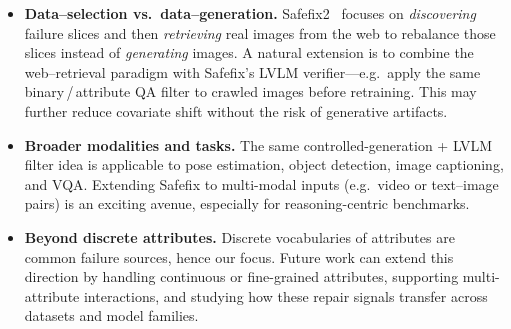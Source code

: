 \documentclass[10pt]{article} %
\newcommand{\model}{Safefix\xspace}
\begin{document}
\begin{itemize}
  \item \textbf{Data–selection vs.\ data–generation.}  
        Safefix2~\citep{chen2025hibug2} focuses on \emph{discovering} failure slices and then
        \emph{retrieving} real images from the web to
        rebalance those slices instead of \emph{generating} images.  A natural extension is to combine the
        web–retrieval paradigm with Safefix’s LVLM verifier—e.g.\ apply the
        same binary\,/\,attribute QA filter to crawled images before
        retraining. This may further reduce covariate shift without the
        risk of generative artifacts.




  \item \textbf{Broader modalities and tasks.}  
        The same controlled-generation + LVLM filter idea is applicable to
        pose estimation, object detection, image captioning, and VQA.
        Extending \model{} to multi-modal inputs (e.g.\ video or text–image
        pairs) is an exciting avenue, especially for reasoning-centric
        benchmarks.
        
    \item \textbf{Beyond discrete attributes.} Discrete vocabularies of attributes are common failure sources, hence our focus. Future work can extend this direction by handling continuous or fine-grained attributes, supporting multi-attribute interactions, and studying how these repair signals transfer across datasets and model families.
\end{itemize}
\end{document}
